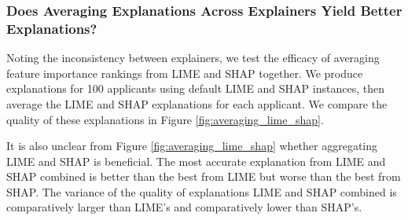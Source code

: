 \documentclass[11pt]{article}    %
\begin{document}
            
            \subsubsection{Does Averaging Explanations Across Explainers Yield Better Explanations?}
                Noting the inconsistency between explainers, we test the efficacy of averaging feature importance rankings from LIME and SHAP together. We produce explanations for 100 applicants using default LIME and SHAP instances, then average the LIME and SHAP explanations for each applicant. We compare the quality of these explanations in Figure \ref{fig:averaging_lime_shap}.  

                It is also unclear from Figure \ref{fig:averaging_lime_shap} whether aggregating LIME and SHAP is beneficial. The most accurate explanation from LIME and SHAP combined is better than the best from LIME but worse than the best from SHAP. The variance of the quality of explanations LIME and SHAP combined is comparatively larger than LIME's and comparatively lower than SHAP's. 
\end{document}
